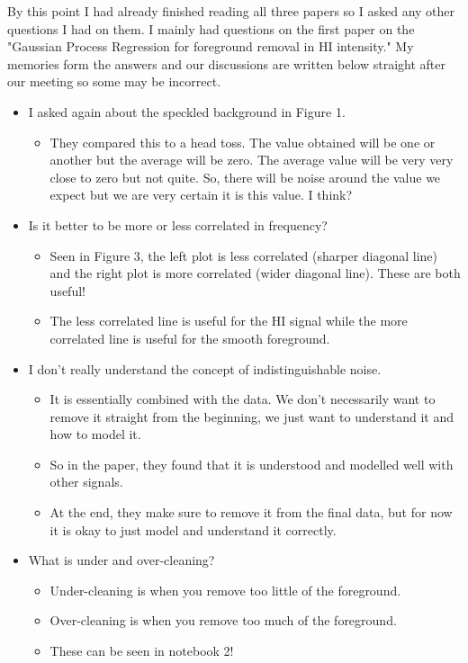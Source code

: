 By this point I had already finished reading all three papers so I asked any other questions I had on them. I mainly had questions on the first paper on the "Gaussian Process Regression for foreground removal in HI intensity." My memories form the answers and our discussions are written below straight after our meeting so some may be incorrect.

\begin{itemize}
    \item I asked again about the speckled background in Figure 1. 
    \begin{itemize}
        \item They compared this to a head toss. The value obtained will be one or another but the average will be zero. The average value will be very very close to zero but not quite. So, there will be noise around the value we expect but we are very certain it is this value. I think?
    \end{itemize}
\item Is it better to be more or less correlated in frequency?
\begin{itemize}
    \item Seen in Figure 3, the left plot is less correlated (sharper diagonal line) and the right plot is more correlated (wider diagonal line). These are both useful!
    \item The less correlated line is useful for the HI signal while the more correlated line is useful for the smooth foreground. 
\end{itemize}
\item I don't really understand the concept of indistinguishable noise.
\begin{itemize}
    \item It is essentially combined with the data. We don't necessarily want to remove it straight from the beginning, we just want to understand it and how to model it. 
    \item So in the paper, they found that it is understood and modelled well with other signals.
    \item At the end, they make sure to remove it from the final data, but for now it is okay to just model and understand it correctly.
\end{itemize}
\item What is under and over-cleaning?
\begin{itemize}
    \item Under-cleaning is when you remove too little of the foreground.
    \item Over-cleaning is when you remove too much of the foreground. 
    \item These can be seen in notebook 2!
\end{itemize}
\end{itemize}

